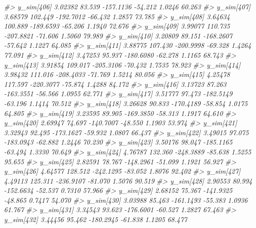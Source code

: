\documentclass[
  10pt,
  italian,
  a4paper,
  extrafontsizes,onecolumn,openright
  ]{memoir}
\newenvironment{Shaded}{\begin{snugshade}}{\end{snugshade}}
\newcommand{\CommentTok}[1]{\textcolor[rgb]{0.56,0.35,0.01}{\textit{#1}}}
\begin{document}
\begin{Shaded}
\begin{Highlighting}[]
\CommentTok{\#\textgreater{}   y\_sim[406]  3.02382  83.539 {-}157.1136 {-}54.212  1.0246  60.263}
\CommentTok{\#\textgreater{}   y\_sim[407]  3.68579 102.449 {-}192.7012 {-}66.432  1.2857  73.785}
\CommentTok{\#\textgreater{}   y\_sim[408]  3.64634 100.889 {-}189.6593 {-}65.206  1.1940  72.676}
\CommentTok{\#\textgreater{}   y\_sim[409]  3.99077 110.735 {-}207.8821 {-}71.606  1.5060  79.989}
\CommentTok{\#\textgreater{}   y\_sim[410]  3.20809  89.151 {-}168.2607 {-}57.642  1.1227  64.085}
\CommentTok{\#\textgreater{}   y\_sim[411]  3.88775 107.430 {-}200.9998 {-}69.328  1.4264  77.091}
\CommentTok{\#\textgreater{}   y\_sim[412]  3.47253  95.937 {-}180.6080 {-}62.278  1.1165  68.743}
\CommentTok{\#\textgreater{}   y\_sim[413]  3.91854 109.017 {-}205.3106 {-}70.432  1.7535  78.923}
\CommentTok{\#\textgreater{}   y\_sim[414]  3.98432 111.016 {-}208.4033 {-}71.769  1.5214  80.056}
\CommentTok{\#\textgreater{}   y\_sim[415]  4.25478 117.597 {-}220.3077 {-}75.874  1.4288  84.172}
\CommentTok{\#\textgreater{}   y\_sim[416]  3.13723  87.263 {-}163.3551 {-}56.566  1.0955  62.771}
\CommentTok{\#\textgreater{}   y\_sim[417]  3.51777  97.473 {-}182.5149 {-}63.196  1.1414  70.512}
\CommentTok{\#\textgreater{}   y\_sim[418]  3.26628  90.833 {-}170.4189 {-}58.854  1.0175  64.805}
\CommentTok{\#\textgreater{}   y\_sim[419]  3.23595  89.905 {-}169.3850 {-}58.313  1.1917  64.610}
\CommentTok{\#\textgreater{}   y\_sim[420]  2.69947  74.697 {-}140.7007 {-}48.550  1.1903  53.974}
\CommentTok{\#\textgreater{}   y\_sim[421]  3.32943  92.495 {-}173.1627 {-}59.932  1.0807  66.437}
\CommentTok{\#\textgreater{}   y\_sim[422]  3.49015  97.075 {-}183.0943 {-}62.882  1.2446  70.230}
\CommentTok{\#\textgreater{}   y\_sim[423]  3.50176  98.047 {-}185.1165 {-}63.494  1.3330  70.649}
\CommentTok{\#\textgreater{}   y\_sim[424]  4.76787 132.360 {-}248.3889 {-}85.638  1.5255  95.655}
\CommentTok{\#\textgreater{}   y\_sim[425]  2.82591  78.767 {-}148.2961 {-}51.099  1.1921  56.927}
\CommentTok{\#\textgreater{}   y\_sim[426]  4.64577 128.512 {-}242.1295 {-}83.052  1.8076  92.402}
\CommentTok{\#\textgreater{}   y\_sim[427]  4.49113 125.311 {-}236.9107 {-}81.070  1.5076  90.519}
\CommentTok{\#\textgreater{}   y\_sim[428]  2.90553  80.994 {-}152.6634 {-}52.537  0.7310  57.966}
\CommentTok{\#\textgreater{}   y\_sim[429]  2.68152  75.367 {-}141.9325 {-}48.865  0.7417  54.070}
\CommentTok{\#\textgreater{}   y\_sim[430]  3.03988  85.463 {-}161.1493 {-}55.383  1.0936  61.767}
\CommentTok{\#\textgreater{}   y\_sim[431]  3.34543  93.623 {-}176.6001 {-}60.527  1.2827  67.463}
\CommentTok{\#\textgreater{}   y\_sim[432]  3.44456  95.462 {-}180.2945 {-}61.838  1.1205  68.477}

\end{Highlighting}
\end{Shaded}
\end{document}
